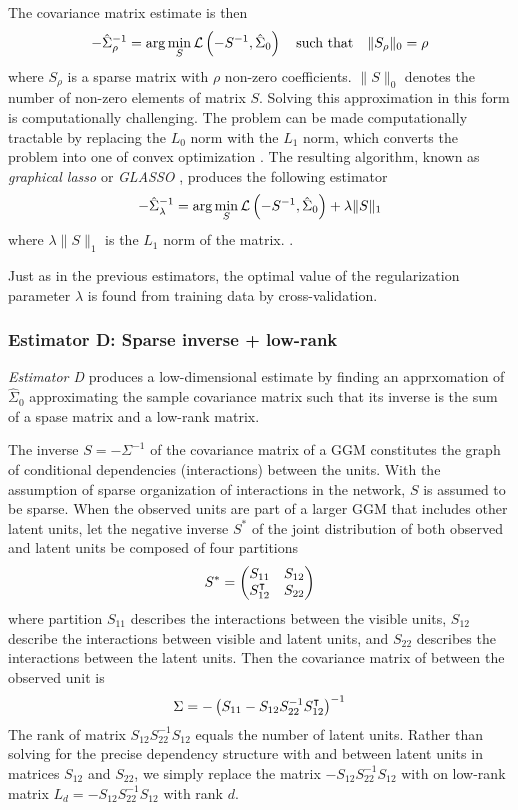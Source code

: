 The covariance matrix estimate is then 
\begin{equation}
-\hat\Sigma_\rho^{-1} =\arg\min\limits_S \mathcal L\left(-S^{-1},\hat\Sigma_0\right)  \quad \mbox{such that} \quad  \|S_\rho\|_0 = \rho
\end{equation}
where $S_\rho$ is a sparse matrix with $\rho$ non-zero coefficients. $\|S\|_0$ denotes the number of non-zero elements of matrix $S$.
Solving this approximation in this form is computationally challenging. The problem can be made computationally tractable by replacing the $L_0$ norm with the $L_1$ norm, which converts the problem into one of convex optimization \cite{Donoho:2000}.  The resulting algorithm, known as \emph{graphical lasso} or \emph{GLASSO}  \cite{Meinshausen:2006,Banerjee:2008,Friedman:2008}, produces the following estimator  
\begin{equation}
-\hat\Sigma_\lambda^{-1} = \arg\min\limits_S \mathcal L\left(-S^{-1},\hat\Sigma_0\right) + \lambda \|S\|_1
\end{equation}
where $\lambda \|S\|_1$ is the $L_1$ norm of the matrix. .

Just as in the previous estimators, the optimal value of the regularization parameter $\lambda$ is found from training data by cross-validation.

\subsubsection*{Estimator D: Sparse inverse + low-rank}
\emph{Estimator D} produces a low-dimensional estimate by finding an apprxomation of $\hat\Sigma_0$ approximating the sample covariance matrix such that its inverse is the sum of a spase matrix and a low-rank matrix. 

The inverse $S=-\Sigma^{-1}$ of the covariance matrix of a GGM constitutes the graph of conditional dependencies (interactions) between the units.  With the assumption of sparse organization of interactions in the network, $S$ is assumed to be sparse.  When the observed units are part of a larger GGM that includes other latent units, let the negative inverse $S^*$ of the joint distribution of both observed and latent units be composed of four partitions
\begin{equation}
S^* = 
\begin{pmatrix}
S_{11} & S_{12} \\
S_{12}^\intercal & S_{22} 
\end{pmatrix}
\end{equation}
where partition $S_{11}$ describes the interactions between the visible units, $S_{12}$ describe the interactions between visible and latent units, and $S_{22}$ describes the interactions between the latent units. 
Then the covariance matrix of between the observed unit is 
\begin{equation}
\Sigma = -\left(S_{11} - S_{12}S_{22}^{-1}S_{12}^\intercal\right)^{-1}
\end{equation} 
The rank of matrix $S_{12}S_{22}^{-1}S_{12}$ equals the number of latent units. Rather than solving for the precise dependency structure with and between latent units in matrices $S_{12}$ and $S_{22}$, we simply replace the matrix $- S_{12}S_{22}^{-1}S_{12}$ with on low-rank matrix $L_d=- S_{12}S_{22}^{-1}S_{12}$ with rank $d$.

